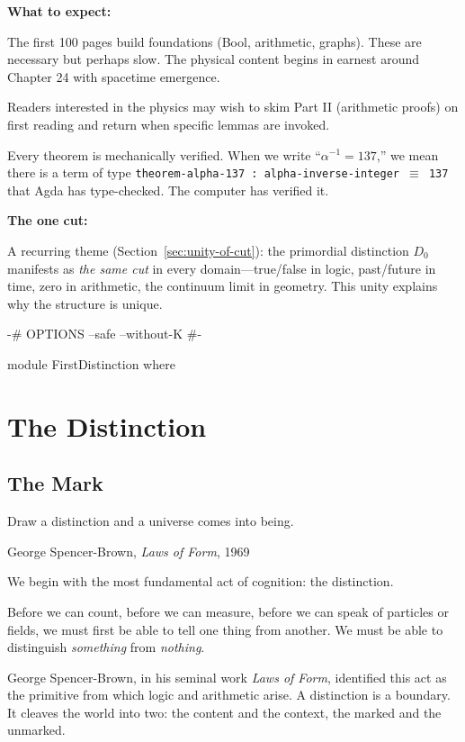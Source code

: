 \documentclass[11pt,a4paper]{book}
\begin{document}
\medskip

\noindent\textbf{What to expect:}

The first 100 pages build foundations (Bool, arithmetic, graphs). These are 
necessary but perhaps slow. The physical content begins in earnest around 
Chapter 24 with spacetime emergence.

Readers interested in the physics may wish to skim Part II (arithmetic proofs) 
on first reading and return when specific lemmas are invoked.

Every theorem is mechanically verified. When we write ``$\alpha^{-1} = 137$,'' 
we mean there is a term of type \texttt{theorem-alpha-137 : alpha-inverse-integer $\equiv$ 137} 
that Agda has type-checked. The computer has verified it.

\medskip

\noindent\textbf{The one cut:}

A recurring theme (Section~\ref{sec:unity-of-cut}): the primordial distinction $D_0$ 
manifests as \emph{the same cut} in every domain---true/false in logic, past/future 
in time, zero in arithmetic, the continuum limit in geometry. This unity explains 
why the structure is unique.

\begin{code}
{-# OPTIONS --safe --without-K #-}

module FirstDistinction where
\end{code}

\tableofcontents
\mainmatter

\part{The Distinction}

\chapter{The Mark}

\epigraph{Draw a distinction and a universe comes into being.}{George Spencer-Brown, \textit{Laws of Form}, 1969}

We begin with the most fundamental act of cognition: the distinction.

Before we can count, before we can measure, before we can speak of particles or 
fields, we must first be able to tell one thing from another. We must be able 
to distinguish \emph{something} from \emph{nothing}.

George Spencer-Brown, in his seminal work \textit{Laws of Form}, identified 
this act as the primitive from which logic and arithmetic arise. A distinction 
is a boundary. It cleaves the world into two: the content and the context, 
the marked and the unmarked.
\end{document}
